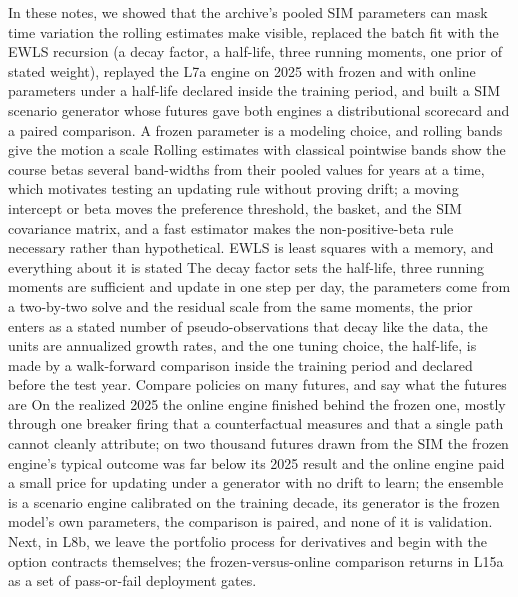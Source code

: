 \documentclass[11pt]{article}
\begin{document}
\newpage
\thispagestyle{fancy}
\keytakeaways
  {In these notes, we showed that the archive's pooled SIM parameters can mask time variation the rolling estimates make visible, replaced the batch fit with the EWLS recursion (a decay factor, a half-life, three running moments, one prior of stated weight), replayed the L7a engine on 2025 with frozen and with online parameters under a half-life declared inside the training period, and built a SIM scenario generator whose futures gave both engines a distributional scorecard and a paired comparison.}
  {A frozen parameter is a modeling choice, and rolling bands give the motion a scale}
  {Rolling estimates with classical pointwise bands show the course betas several band-widths from their pooled values for years at a time, which motivates testing an updating rule without proving drift; a moving intercept or beta moves the preference threshold, the basket, and the SIM covariance matrix, and a fast estimator makes the non-positive-beta rule necessary rather than hypothetical.}
  {EWLS is least squares with a memory, and everything about it is stated}
  {The decay factor sets the half-life, three running moments are sufficient and update in one step per day, the parameters come from a two-by-two solve and the residual scale from the same moments, the prior enters as a stated number of pseudo-observations that decay like the data, the units are annualized growth rates, and the one tuning choice, the half-life, is made by a walk-forward comparison inside the training period and declared before the test year.}
  {Compare policies on many futures, and say what the futures are}
  {On the realized 2025 the online engine finished behind the frozen one, mostly through one breaker firing that a counterfactual measures and that a single path cannot cleanly attribute; on two thousand futures drawn from the SIM the frozen engine's typical outcome was far below its 2025 result and the online engine paid a small price for updating under a generator with no drift to learn; the ensemble is a scenario engine calibrated on the training decade, its generator is the frozen model's own parameters, the comparison is paired, and none of it is validation.}
  {Next, in L8b, we leave the portfolio process for derivatives and begin with the option contracts themselves; the frozen-versus-online comparison returns in L15a as a set of pass-or-fail deployment gates.}
\end{document}
